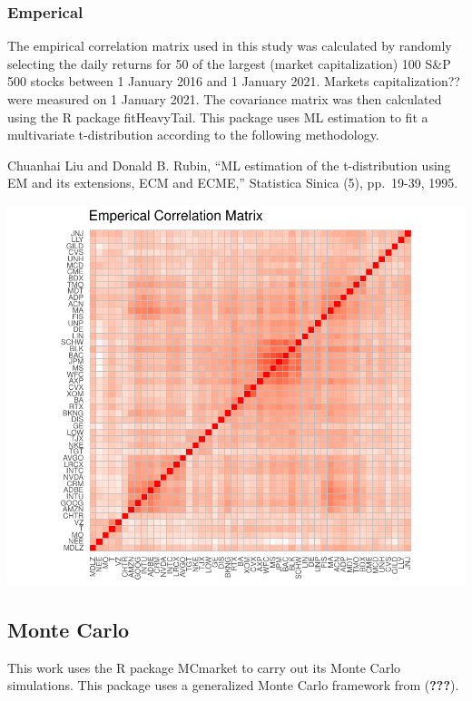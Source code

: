 \documentclass[11pt,preprint, authoryear]{elsarticle}
\numberwithin{equation}{section}
\numberwithin{figure}{section}
\numberwithin{table}{section}
\begin{document}
\hypertarget{emperical}{%
\subsubsection{\texorpdfstring{Emperical
\label{emp}}{Emperical }}\label{emperical}}

The empirical correlation matrix used in this study was calculated by
randomly selecting the daily returns for 50 of the largest (market
capitalization) 100 S\&P 500 stocks between 1 January 2016 and 1 January
2021. Markets capitalization?? were measured on 1 January 2021. The
covariance matrix was then calculated using the R package fitHeavyTail.
This package uses ML estimation to fit a multivariate t-distribution
according to the following methodology.

Chuanhai Liu and Donald B. Rubin, ``ML estimation of the t-distribution
using EM and its extensions, ECM and ECME,'' Statistica Sinica (5),
pp.~19-39, 1995.

\includegraphics{Thesis_files/figure-latex/unnamed-chunk-1-1.pdf}

\hypertarget{monte-carlo}{%
\subsection{Monte Carlo}\label{monte-carlo}}

This work uses the R package MCmarket to carry out its Monte Carlo
simulations. This package uses a generalized Monte Carlo framework from
({\textbf{???}}).
\end{document}
